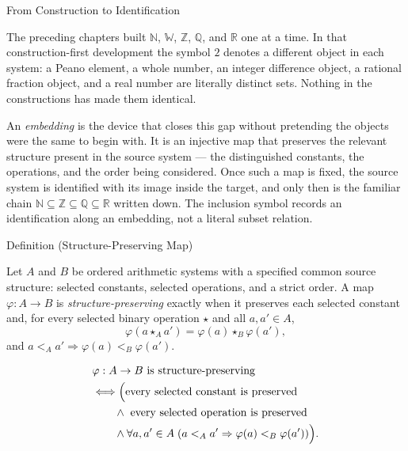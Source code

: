 \label{sec:embeddings-as-structure-preserving-maps}

\begin{topicbox}{From Construction to Identification}
\begin{exposition}
The preceding chapters built $\mathbb{N}$, $\mathbb{W}$, $\mathbb{Z}$, $\mathbb{Q}$, and $\mathbb{R}$ one at a time. In that construction-first development the symbol $2$ denotes a different object in each system: a Peano element, a whole number, an integer difference object, a rational fraction object, and a real number are literally distinct sets. Nothing in the constructions has made them identical.
\end{exposition}
\begin{exposition}
An \emph{embedding} is the device that closes this gap without pretending the objects were the same to begin with. It is an injective map that preserves the relevant structure present in the source system --- the distinguished constants, the operations, and the order being considered. Once such a map is fixed, the source system is identified with its image inside the target, and only then is the familiar chain $\mathbb{N}\subseteq\mathbb{Z}\subseteq\mathbb{Q}\subseteq\mathbb{R}$ written down. The inclusion symbol records an identification along an embedding, not a literal subset relation.
\end{exposition}
\end{topicbox}
\begin{definitionbox}{Definition (Structure-Preserving Map)}
\begin{definition}
\label{def:structure-preserving-map}
Let $A$ and $B$ be ordered arithmetic systems with a specified common source
structure: selected constants, selected operations, and a strict order. A map
$\varphi:A\to B$ is \emph{structure-preserving} exactly when it preserves each
selected constant and, for every selected binary operation $\star$ and all
$a,a'\in A$,
\[
\varphi(a\star_A a')=\varphi(a)\star_B\varphi(a'),
\]
and $a<_A a' \Longrightarrow \varphi(a)<_B\varphi(a')$.
\end{definition}
\end{definitionbox}
\begin{remark*}
\[
\begin{aligned}
&\varphi:A\to B \text{ is structure-preserving}\\
&\Longleftrightarrow
\Bigl(\text{every selected constant is preserved}\\
&\qquad\land\ \text{every selected operation is preserved}\\
&\qquad\land \forall a,a'\in A\;(a<_A a' \Rightarrow \varphi(a)<_B\varphi(a'))\Bigr).
\end{aligned}
\]
\end{remark*}
